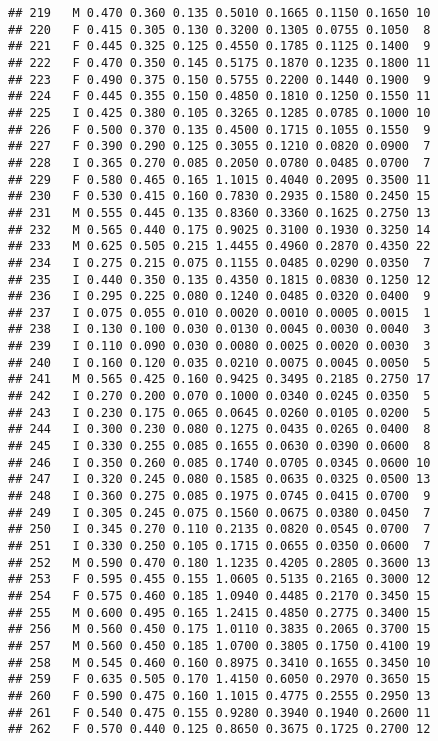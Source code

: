 \documentclass[
]{article}
\begin{document}
\begin{verbatim}
## 219   M 0.470 0.360 0.135 0.5010 0.1665 0.1150 0.1650 10
## 220   F 0.415 0.305 0.130 0.3200 0.1305 0.0755 0.1050  8
## 221   F 0.445 0.325 0.125 0.4550 0.1785 0.1125 0.1400  9
## 222   F 0.470 0.350 0.145 0.5175 0.1870 0.1235 0.1800 11
## 223   F 0.490 0.375 0.150 0.5755 0.2200 0.1440 0.1900  9
## 224   F 0.445 0.355 0.150 0.4850 0.1810 0.1250 0.1550 11
## 225   I 0.425 0.380 0.105 0.3265 0.1285 0.0785 0.1000 10
## 226   F 0.500 0.370 0.135 0.4500 0.1715 0.1055 0.1550  9
## 227   F 0.390 0.290 0.125 0.3055 0.1210 0.0820 0.0900  7
## 228   I 0.365 0.270 0.085 0.2050 0.0780 0.0485 0.0700  7
## 229   F 0.580 0.465 0.165 1.1015 0.4040 0.2095 0.3500 11
## 230   F 0.530 0.415 0.160 0.7830 0.2935 0.1580 0.2450 15
## 231   M 0.555 0.445 0.135 0.8360 0.3360 0.1625 0.2750 13
## 232   M 0.565 0.440 0.175 0.9025 0.3100 0.1930 0.3250 14
## 233   M 0.625 0.505 0.215 1.4455 0.4960 0.2870 0.4350 22
## 234   I 0.275 0.215 0.075 0.1155 0.0485 0.0290 0.0350  7
## 235   I 0.440 0.350 0.135 0.4350 0.1815 0.0830 0.1250 12
## 236   I 0.295 0.225 0.080 0.1240 0.0485 0.0320 0.0400  9
## 237   I 0.075 0.055 0.010 0.0020 0.0010 0.0005 0.0015  1
## 238   I 0.130 0.100 0.030 0.0130 0.0045 0.0030 0.0040  3
## 239   I 0.110 0.090 0.030 0.0080 0.0025 0.0020 0.0030  3
## 240   I 0.160 0.120 0.035 0.0210 0.0075 0.0045 0.0050  5
## 241   M 0.565 0.425 0.160 0.9425 0.3495 0.2185 0.2750 17
## 242   I 0.270 0.200 0.070 0.1000 0.0340 0.0245 0.0350  5
## 243   I 0.230 0.175 0.065 0.0645 0.0260 0.0105 0.0200  5
## 244   I 0.300 0.230 0.080 0.1275 0.0435 0.0265 0.0400  8
## 245   I 0.330 0.255 0.085 0.1655 0.0630 0.0390 0.0600  8
## 246   I 0.350 0.260 0.085 0.1740 0.0705 0.0345 0.0600 10
## 247   I 0.320 0.245 0.080 0.1585 0.0635 0.0325 0.0500 13
## 248   I 0.360 0.275 0.085 0.1975 0.0745 0.0415 0.0700  9
## 249   I 0.305 0.245 0.075 0.1560 0.0675 0.0380 0.0450  7
## 250   I 0.345 0.270 0.110 0.2135 0.0820 0.0545 0.0700  7
## 251   I 0.330 0.250 0.105 0.1715 0.0655 0.0350 0.0600  7
## 252   M 0.590 0.470 0.180 1.1235 0.4205 0.2805 0.3600 13
## 253   F 0.595 0.455 0.155 1.0605 0.5135 0.2165 0.3000 12
## 254   F 0.575 0.460 0.185 1.0940 0.4485 0.2170 0.3450 15
## 255   M 0.600 0.495 0.165 1.2415 0.4850 0.2775 0.3400 15
## 256   M 0.560 0.450 0.175 1.0110 0.3835 0.2065 0.3700 15
## 257   M 0.560 0.450 0.185 1.0700 0.3805 0.1750 0.4100 19
## 258   M 0.545 0.460 0.160 0.8975 0.3410 0.1655 0.3450 10
## 259   F 0.635 0.505 0.170 1.4150 0.6050 0.2970 0.3650 15
## 260   F 0.590 0.475 0.160 1.1015 0.4775 0.2555 0.2950 13
## 261   F 0.540 0.475 0.155 0.9280 0.3940 0.1940 0.2600 11
## 262   F 0.570 0.440 0.125 0.8650 0.3675 0.1725 0.2700 12

\end{verbatim}
\end{document}
